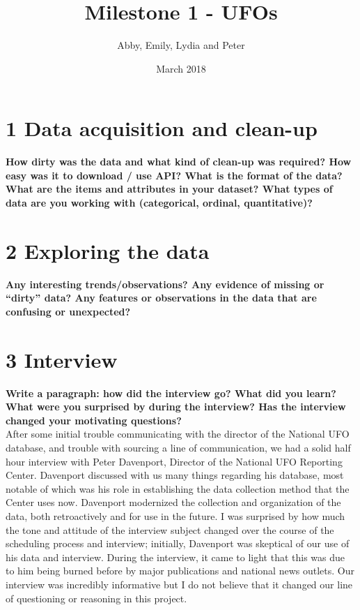 \documentclass{neu_handout}
\title{Milestone 1 - UFOs}
\author{Abby, Emily, Lydia and Peter}
\date{March 2018}
\begin{document}
\section*{1 Data acquisition and clean-up}

\textbf{How dirty was the data and what kind of clean-up was required? How
easy was it to download / use API? What is the format of the data? What are the
items and attributes in your dataset? What types of data are you working with
(categorical, ordinal, quantitative)?}\\


\section*{2 Exploring the data}

\textbf{Any interesting
trends/observations? Any evidence of missing or “dirty” data? Any features or
observations in the data that are confusing or unexpected?}\\



\section*{3 Interview}

\textbf{Write a paragraph: how did the interview go? What did you learn? What were you surprised by during the interview? Has the interview changed your motivating questions?}\\ 

After some initial trouble communicating with the director of the National UFO database, and trouble with sourcing a line of communication, we had a solid half hour interview with Peter Davenport, Director of the National UFO Reporting Center. Davenport discussed with us many things regarding his database, most notable of which was his role in establishing the data collection method that the Center uses now. Davenport modernized the collection and organization of the data, both retroactively and for use in the future. I was surprised by how much the tone and attitude of the interview subject changed over the course of the scheduling process and interview; initially, Davenport was skeptical of our use of his data and interview. During the interview, it came to light that this was due to him being burned before by major publications and national news outlets. Our interview was incredibly informative but I do not believe that it changed our line of questioning or reasoning in this project. 
\end{document}
